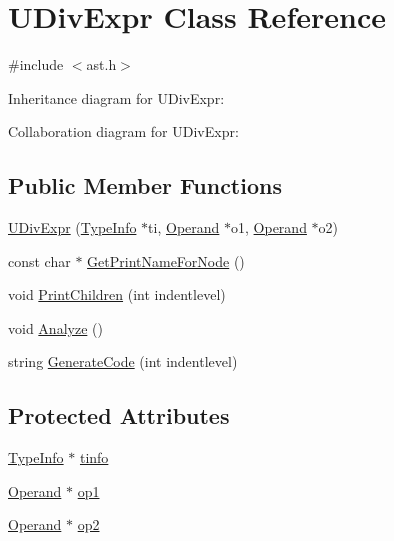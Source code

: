 \hypertarget{class_u_div_expr}{}\section{U\+Div\+Expr Class Reference}
\label{class_u_div_expr}


{\ttfamily \#include $<$ast.\+h$>$}



Inheritance diagram for U\+Div\+Expr\+:


Collaboration diagram for U\+Div\+Expr\+:
\subsection*{Public Member Functions}
\begin{DoxyCompactItemize}
\item 
\hyperlink{class_u_div_expr_a49d8bc91666c4b25c527d8b9544d3ae6}{U\+Div\+Expr} (\hyperlink{class_type_info}{Type\+Info} $\ast$ti, \hyperlink{class_operand}{Operand} $\ast$o1, \hyperlink{class_operand}{Operand} $\ast$o2)
\item 
const char $\ast$ \hyperlink{class_u_div_expr_aa7e3510bc0445544639489b6bc3a9a0c}{Get\+Print\+Name\+For\+Node} ()
\item 
void \hyperlink{class_u_div_expr_aaaa57ba84ad8390c4511bdc808968e4e}{Print\+Children} (int indentlevel)
\item 
void \hyperlink{class_u_div_expr_a5c7df8e6be9e8f173b9920d5c13e704f}{Analyze} ()
\item 
string \hyperlink{class_u_div_expr_a9d76ec802dcedb0b5045ca8b293a0595}{Generate\+Code} (int indentlevel)
\end{DoxyCompactItemize}
\subsection*{Protected Attributes}
\begin{DoxyCompactItemize}
\item 
\hyperlink{class_type_info}{Type\+Info} $\ast$ \hyperlink{class_u_div_expr_a90230f48a89ec295ce5e00bf1c53da9a}{tinfo}
\item 
\hyperlink{class_operand}{Operand} $\ast$ \hyperlink{class_u_div_expr_a6cf26648d5ab920e3ada74049b97e1dc}{op1}
\item 
\hyperlink{class_operand}{Operand} $\ast$ \hyperlink{class_u_div_expr_a51a099174f6ba3b9506be8744b20e6f1}{op2}
\end{DoxyCompactItemize}


